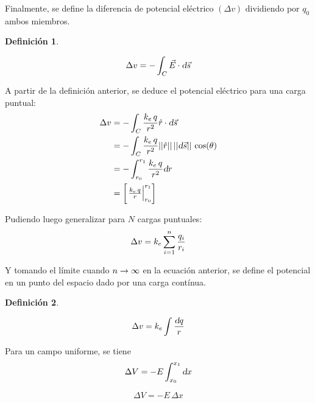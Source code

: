 \documentclass[a5paper,12pt,twoside]{book}
\newtheorem{defn}{{Definición}}[chapter]
\begin{document}
Finalmente, se define la diferencia de potencial eléctrico $(\Delta v)$ dividiendo por $q_0$ ambos miembros.

\begin{mdframed}[style=MyFrame1]
    \begin{defn}
        \label{defn:potEle}
    \end{defn}
    \begin{equation*}
        \Delta v = - \int_C \Vec{E} \cdot \textsl{d} \Vec{s}
    \end{equation*}
\end{mdframed}

A partir de la definición anterior, se deduce el potencial eléctrico para una carga puntual:
\begin{align*}
    \Delta v &= - \int_C \frac{k_e \, q}{r^2} \hat{r} \cdot \textsl{d} \Vec{s}
    \\
    &= - \int_C \frac{k_e \, q}{r^2} {\left|\left| {\hat{r}} \right|\right|} \, {\left|\left| {\textsl{d} \Vec{s}} \right|\right|} \, \cos(\theta)
    \\
    &= - \int_{r_0}^{r_1} \frac{k_e \, q}{r^2} \textsl{d} r
    \\
    &= \begin{bmatrix} \left. \frac{k_e \, q}{r} \right|_{r_0}^{r_1} \end{bmatrix}
\end{align*}

Pudiendo luego generalizar para $N$ cargas puntuales:
\begin{equation}
    \Delta v = k_e \sum_{i=1}^n \frac{q_i}{r_i}
\end{equation}

Y tomando el límite cuando $n\to\infty$ en la ecuación anterior, se define el potencial en un punto del espacio dado por una carga contínua.

\begin{mdframed}[style=MyFrame1]
    \begin{defn}
    \end{defn}
    \begin{equation*}
        \Delta v = k_e \int \frac{\textsl{d} q}{r}
    \end{equation*}
\end{mdframed}

Para un campo uniforme, se tiene
\begin{equation*}
    \Delta V = - E \int_{x_0}^{x_1} \textsl{d} x
\end{equation*}


\begin{equation*}
    \Delta V = - E \, \Delta x
\end{equation*}
\end{document}
